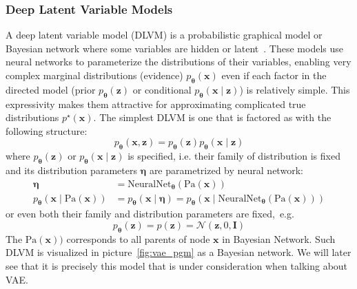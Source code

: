 \subsubsection{Deep Latent Variable Models}
A deep latent variable model (DLVM) is a probabilistic graphical model or Bayesian network where some variables are hidden or latent~\cite{intro-vae-2019}.
These models use neural networks to parameterize the distributions of their variables, enabling very complex marginal distributions (evidence)
$p_{\boldsymbol{\theta}}(\mathbf{x})$ even if each factor in the directed model (prior $p_{\boldsymbol{\theta}}(\mathbf{z})$ or conditional $p_{\boldsymbol{\theta}}(\mathbf{x}\mid \mathbf{z})$)
is relatively simple. This expressivity makes them attractive for approximating complicated true distributions $p^\star(\mathbf{x})$. 
The simplest DLVM is one that is factored as with the following structure:
$$
p_{\boldsymbol{\theta}}(\mathbf{x},\mathbf{z}) = p_{\boldsymbol{\theta}}(\mathbf{z})p_{\boldsymbol{\theta}}(\mathbf{x}\mid \mathbf{z})
$$
where $p_{\boldsymbol{\theta}}(\mathbf{z})$ or $p_{\boldsymbol{\theta}}(\mathbf{x}\mid \mathbf{z})$ is specified, i.e. their family of distribution is fixed and its distribution
parameters $\boldsymbol{\eta}$ are parametrized by neural network:
\begin{align*}
\boldsymbol{\eta} &= \mathrm{NeuralNet}_{\boldsymbol{\theta}}(\text{Pa}(\mathbf{x})) \\
p_{\boldsymbol{\theta}}(\mathbf{x}\mid \text{Pa}(\mathbf{x})) &= p_{\boldsymbol{\theta}}(\boldsymbol{x}\mid \boldsymbol{\eta}) =  p_{\boldsymbol{\theta}}(\boldsymbol{x} \mid \mathrm{NeuralNet}_{\boldsymbol{\theta}}(\text{Pa}(\mathbf{x})))
\end{align*}
or even both their family and distribution parameters are fixed,~e.g. 
$$
p_{\boldsymbol{\theta}}(\mathbf{z}) = p(\mathbf{z}) = \mathcal{N}(\mathbf{z},0,\mathbf{I})
$$
The $\text{Pa}(\mathbf{x}))$ corresponds to all parents of node $\mathbf{x}$ in Bayesian Network.
Such DLVM is visualized in picture~\ref{fig:vae_pgm} as a Bayesian network. We will later see that 
it is precisely this model that is under consideration when talking about VAE. 

